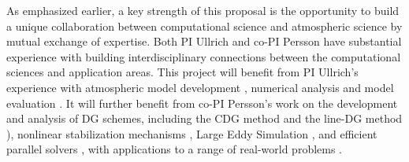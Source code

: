 \documentclass[11pt]{article}
\begin{document}
As emphasized earlier, a key strength of this proposal is the opportunity to build a unique collaboration between computational science and atmospheric science by mutual exchange of expertise.  Both PI Ullrich and co-PI Persson have substantial experience with building interdisciplinary connections between the computational sciences and application areas.  This project will benefit from PI Ullrich's experience with atmospheric model development  \cite{PHLRDNPAU2010JCP, PAUCJBVL2010JCP, PHLPAURDN2011SPRINGER, PAUCJ2012MWR, PAUMN2012QJRMS, PAUCJ2012JCP, guba2014viscosity, ullrich2014understanding, ullrich2014global}, numerical analysis \cite{ullrich2011analysis, ullrich2012considerations} and model evaluation \cite{DCMIP2012TESTCASES, ullrich2014proposed, kent2013dynamical, ullrich2014baroclinic}.  It will further benefit from co-PI Persson's work on the development and analysis of DG schemes, including the CDG method \cite{peraire08cdg} and the line-DG method \cite{persson13linedg}), nonlinear stabilization mechanisms \cite{persson06shock}, Large Eddy Simulation \cite{uranga11iles}, and efficient parallel solvers \cite{persson08newtongmres,persson09parallel}, with applications to a range of real-world problems \cite{persson09ale,peraire11dg}.





\end{document}
